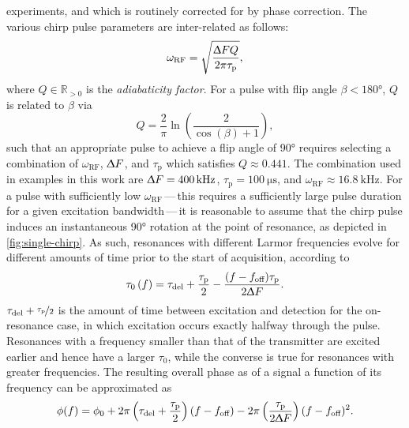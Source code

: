 experiments, and which is routinely corrected for by phase correction.
The various chirp pulse parameters are inter-related as
follows\cite{Foroozandeh2019,Kupce1995b}:
\begin{equation}
    \omega_{\text{RF}} = \sqrt{
        \frac{\Updelta F Q}{2 \pi \tau_{\text{p}}}
    },
\end{equation}
where $Q \in \mathbb{R}_{>0}$ is the \emph{adiabaticity factor}.
For a pulse with flip angle  $\beta < \ang{180}$, $Q$ is related to $\beta$ via
\begin{equation}
    Q = \frac{2}{\pi} \ln \left( \frac{2}{\cos(\beta) + 1} \right),
\end{equation}
such that an appropriate pulse to achieve a flip angle of \ang{90} requires
selecting a combination of $\omega_{\text{RF}}$, $\Updelta F$, and
$\tau_{\text{p}}$ which satisfies $Q \approx 0.441$.
The combination used in examples in this work are $\Updelta F =
\qty{400}{\kilo\hertz}$, $\tau_{\text{p}} = \qty{100}{\micro\second}$, and
$\omega_{\text{RF}} \approx \qty{16.8}{\kilo\hertz}$.
For a pulse with sufficiently low $\omega_{\text{RF}}$\,---\,this requires a
sufficiently large pulse duration for a given excitation bandwidth\,---\,it is
reasonable to assume that the chirp pulse induces an instantaneous \ang{90}
rotation at the point of resonance, as depicted in
\cref{fig:single-chirp}. As such, resonances with different
Larmor frequencies evolve for different amounts of time prior to the start of
acquisition, according to
\begin{equation}
    \tau_0\left(f\right) =
        \tau_{\text{del}} + \frac{\tau_{\text{p}}}{2} -
        \frac{(f - f_{\text{off}}) \tau_{\text{p}}}{2 \Updelta F}.
    \label{eq:t0}
\end{equation}
$\tau_{\text{del}} + \nicefrac{\tau_{\text{p}}}{2}$ is the amount of time
between excitation and detection for the on-resonance case, in which
excitation occurs exactly halfway through the pulse. Resonances
with a frequency smaller than that of the transmitter are excited earlier and hence
have a larger $\tau_0$, while the converse is true for resonances with greater
frequencies. The resulting overall phase as of a signal a function of its
frequency can be approximated as\cite{Foroozandeh2019}
\begin{equation}
    \phi(f) = \phi_0 + 2 \pi \left(\tau_{\text{del}} + \frac{\tau_{\text{p}}}{2} \right) (f - f_{\text{off}}) -
        2 \pi \left(\frac{\tau_{\text{p}}}{2 \Updelta F}\right)
        (f - f_{\text{off}})^2.
    \label{eq:quadratic-phase}
\end{equation}
